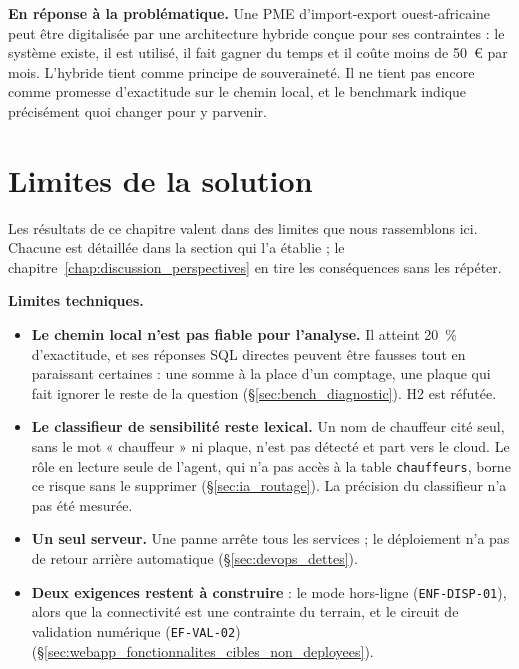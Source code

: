 \textbf{En réponse à la problématique.} Une PME d'import-export ouest-africaine peut être digitalisée par une architecture hybride conçue pour ses contraintes : le système existe, il est utilisé, il fait gagner du temps et il coûte moins de 50~€ par mois. L'hybride tient comme principe de souveraineté. Il ne tient pas encore comme promesse d'exactitude sur le chemin local, et le benchmark indique précisément quoi changer pour y parvenir.

\section{Limites de la solution}
\label{sec:limites_solution}

Les résultats de ce chapitre valent dans des limites que nous rassemblons ici. Chacune est détaillée dans la section qui l'a établie ; le chapitre~\ref{chap:discussion_perspectives} en tire les conséquences sans les répéter.

\textbf{Limites techniques.}
\begin{itemize}
    \item \textbf{Le chemin local n'est pas fiable pour l'analyse.} Il atteint 20~\% d'exactitude, et ses réponses SQL directes peuvent être fausses tout en paraissant certaines : une somme à la place d'un comptage, une plaque qui fait ignorer le reste de la question (§\ref{sec:bench_diagnostic}). H2 est réfutée.
    \item \textbf{Le classifieur de sensibilité reste lexical.} Un nom de chauffeur cité seul, sans le mot « chauffeur » ni plaque, n'est pas détecté et part vers le cloud. Le rôle en lecture seule de l'agent, qui n'a pas accès à la table \texttt{chauffeurs}, borne ce risque sans le supprimer (§\ref{sec:ia_routage}). La précision du classifieur n'a pas été mesurée.
    \item \textbf{Un seul serveur.} Une panne arrête tous les services ; le déploiement n'a pas de retour arrière automatique (§\ref{sec:devops_dettes}).
    \item \textbf{Deux exigences restent à construire} : le mode hors-ligne (\texttt{ENF-DISP-01}), alors que la connectivité est une contrainte du terrain, et le circuit de validation numérique (\texttt{EF-VAL-02}) (§\ref{sec:webapp_fonctionnalites_cibles_non_deployees}).
\end{itemize}

